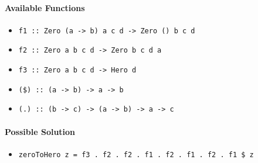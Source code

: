 \documentclass[preprint,12pt]{elsarticle}
\begin{document}
\paragraph{Available Functions} 
\begin{itemize}
    \item \texttt{f1 :: Zero (a -> b) a c d -> Zero () b c d}
    \item \texttt{f2 :: Zero a b c d -> Zero b c d a}
    \item \texttt{f3 :: Zero a b c d -> Hero d}
    \item \texttt{(\$) :: (a -> b) -> a -> b}
    \item \texttt{(.) :: (b -> c) -> (a -> b) -> a -> c}
\end{itemize}

\paragraph{Possible Solution} 
\begin{itemize}
    \item \texttt{zeroToHero z = f3 . f2 . f2 . f1 . f2 . f1 . f2 . f1 \$ z}
\end{itemize}
\end{document}
